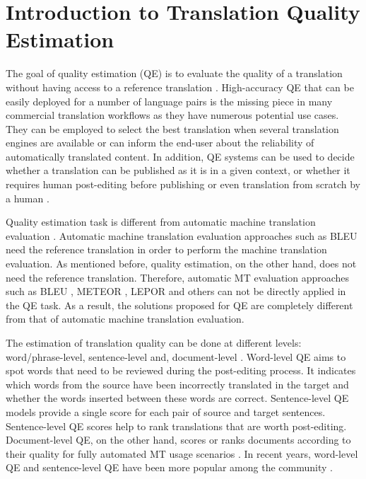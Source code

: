 
\DeclareRobustCommand{\hlgreen}[1]{{\sethlcolor{asparagus}\hl{#1}}}

\DeclareRobustCommand{\hlred}[1]{{\sethlcolor{brickred}\hl{#1}}}

\newcommand{\hlc}[2][yellow]{{%
		\colorlet{foo}{#1}%
		\sethlcolor{foo}\hl{#2}}%
}


\chapter{\label{cha:qe_introduction}Introduction to Translation Quality Estimation}

The goal of quality estimation (QE) is to evaluate the quality of a translation without having access to a reference translation \autocite{specia-etal-2018-findings}. High-accuracy QE that can be easily deployed for a number of language pairs is the missing piece in many commercial translation workflows as they have numerous potential use cases. They can be employed to select the best translation when several translation engines are available or can inform the end-user about the reliability of automatically translated content. In addition, QE systems can be used to decide whether a translation can be published as it is in a given context, or whether it requires human post-editing before publishing or even translation from scratch by a human  \autocite{kepler-etal-2019-openkiwi}. 

Quality estimation task is different from automatic machine translation evaluation \autocite{barrault-etal-2020-findings}. Automatic machine translation evaluation approaches such as BLEU \autocite{papineni-etal-2002-bleu} need the reference translation in order to perform the machine translation evaluation. As mentioned before, quality estimation, on the other hand, does not need the reference translation. Therefore, automatic MT evaluation approaches such as BLEU \autocite{papineni-etal-2002-bleu}, METEOR \autocite{banerjee-lavie-2005-meteor}, LEPOR \autocite{han-etal-2012-lepor} and others can not be directly applied in the QE task. As a result, the solutions proposed for QE are completely different from that of automatic machine translation evaluation.

The estimation of translation quality can be done at different levels: word/phrase-level, sentence-level and, document-level \autocite{ive-etal-2018-deepquest}. Word-level QE aims to spot words that need to be reviewed during the post-editing process. It indicates which words from the source have been incorrectly translated in the target and whether the words inserted between these words are correct. Sentence-level QE models provide a single score for each pair of source and target sentences. Sentence-level QE scores help to rank translations that are worth post-editing. Document-level QE, on the other hand, scores or ranks documents according to their quality for fully automated MT usage scenarios \autocite{ive-etal-2018-deepquest}. In recent years, word-level QE and sentence-level QE have been more popular among the community \autocite{specia-etal-2018-findings}.

